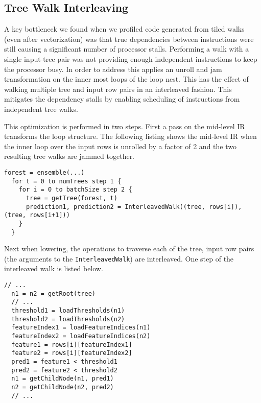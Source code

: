 \subsection{Tree Walk Interleaving}
A key bottleneck we found when we profiled code generated from tiled walks (even after vectorization) was that true dependencies between instructions were still causing
a significant number of processor stalls. Performing a walk with a single input-tree pair was not providing enough independent instructions to keep the processor busy. In order to address this \Treebeard{} applies an unroll and jam transformation on the inner most loops of the loop nest. This has 
the effect of walking multiple tree and input row pairs in an interleaved fashion. 
This mitigates the dependency stalls by enabling scheduling of instructions from independent tree walks. 

This optimization is performed in two steps. 
First a pass on the mid-level IR transforms the loop structure. 
The following listing shows the mid-level IR when the inner loop over the input rows is unrolled 
by a factor of 2 and the two resulting tree walks are jammed together.

\begin{lstlisting}[style=c++]
  forest = ensemble(...)
  for t = 0 to numTrees step 1 {
    for i = 0 to batchSize step 2 {
      tree = getTree(forest, t)
      prediction1, prediction2 = InterleavedWalk((tree, rows[i]), (tree, rows[i+1]))
    }
  }
\end{lstlisting}
Next when lowering, the operations to traverse each of the tree, input row pairs 
(the arguments to the \texttt{InterleavedWalk}) are interleaved. One step of the interleaved 
walk is listed below. 
\begin{lstlisting}[style=c++]
  // ... 
  n1 = n2 = getRoot(tree)
  // ...
  threshold1 = loadThresholds(n1)
  threshold2 = loadThresholds(n2)
  featureIndex1 = loadFeatureIndices(n1)
  featureIndex2 = loadFeatureIndices(n2)
  feature1 = rows[i][featureIndex1]
  feature2 = rows[i][featureIndex2]
  pred1 = feature1 < threshold1
  pred2 = feature2 < threshold2
  n1 = getChildNode(n1, pred1)
  n2 = getChildNode(n2, pred2)
  // ...
\end{lstlisting}

